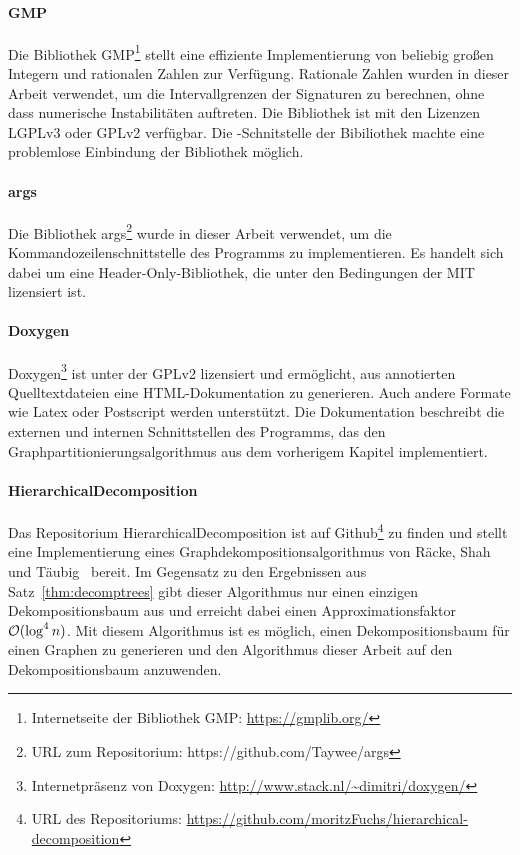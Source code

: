 \paragraph{GMP}
Die Bibliothek GMP\footnote{Internetseite der Bibliothek GMP: \url{https://gmplib.org/}} stellt eine effiziente Implementierung von beliebig großen Integern und rationalen Zahlen zur Verfügung.
Rationale Zahlen wurden in dieser Arbeit verwendet, um die Intervallgrenzen der Signaturen zu berechnen, ohne dass numerische Instabilitäten auftreten. 
Die Bibliothek ist mit den Lizenzen LGPLv3 oder GPLv2 verfügbar.
Die \Cpp\hyp Schnitstelle der Bibiliothek machte eine problemlose Einbindung der Bibliothek möglich.

\paragraph{args}
Die Bibliothek args\footnote{URL zum Repositorium: https://github.com/Taywee/args} wurde in dieser Arbeit verwendet, um die Kommandozeilenschnittstelle des Programms zu implementieren.
Es handelt sich dabei um eine Header-Only-Bibliothek, die unter den Bedingungen der MIT lizensiert ist.

\paragraph{Doxygen}
Doxygen\footnote{Internetpräsenz von Doxygen: \url{http://www.stack.nl/~dimitri/doxygen/}} ist unter der GPLv2 lizensiert und ermöglicht, aus annotierten Quelltextdateien eine HTML\hyp Dokumentation zu generieren.
Auch andere Formate wie Latex oder Postscript werden unterstützt.
Die Dokumentation beschreibt die externen und internen Schnittstellen des Programms, das den Graphpartitionierungsalgorithmus aus dem vorherigem Kapitel implementiert.

\paragraph{HierarchicalDecomposition}
Das Repositorium HierarchicalDecomposition ist auf Github\footnote{URL des Repositoriums: \url{https://github.com/moritzFuchs/hierarchical-decomposition}} zu finden und stellt eine Implementierung eines Graphdekompositionsalgorithmus von Räcke, Shah und Täubig~\parencite{RST14} bereit.
Im Gegensatz zu den Ergebnissen aus Satz~\ref{thm:decomptrees} gibt dieser Algorithmus nur einen einzigen Dekompositionsbaum aus und erreicht dabei einen Approximationsfaktor $\mathcal{O}(\log^4 n)$.
Mit diesem Algorithmus ist es möglich, einen Dekompositionsbaum für einen Graphen zu generieren und den Algorithmus dieser Arbeit auf den Dekompositionsbaum anzuwenden.

